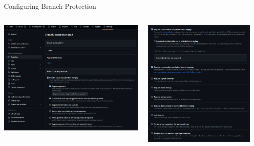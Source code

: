 \documentclass[aspectratio=169]{beamer}
\begin{document}
\begin{frame}{Configuring Branch Protection}
    \begin{columns}
        \begin{column}{0.5\textwidth}
            \includegraphics[width=\textwidth,height=0.8\textheight,keepaspectratio]{branch_protection_1.png}
        \end{column}
        \begin{column}{0.5\textwidth}
            \includegraphics[width=\textwidth,height=0.8\textheight,keepaspectratio]{branch_protection_2.png}
        \end{column}
    \end{columns}
    \centering
\end{frame}
\end{document}
